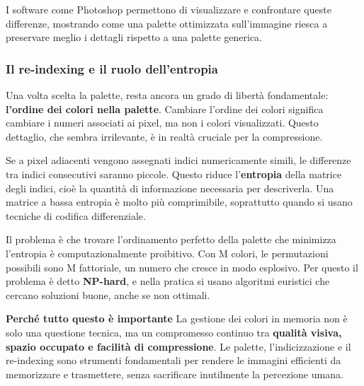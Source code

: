 \documentclass[
]{article}
\begin{document}
I software come Photoshop permettono di visualizzare e confrontare queste differenze, mostrando come una palette ottimizzata sull'immagine riesca a preservare meglio i dettagli rispetto a una palette generica.

\hypertarget{il-re-indexing-e-il-ruolo-dellentropia}{%
\subsubsection{\texorpdfstring{\textbf{Il re-indexing e il ruolo dell'entropia}}{Il re-indexing e il ruolo dell'entropia}}\label{il-re-indexing-e-il-ruolo-dellentropia}}

Una volta scelta la palette, resta ancora un grado di libertà fondamentale: \textbf{l'ordine dei colori nella palette}. Cambiare l'ordine dei colori significa cambiare i numeri associati ai pixel, ma non i colori visualizzati. Questo dettaglio, che sembra irrilevante, è in realtà cruciale per la compressione.

Se a pixel adiacenti vengono assegnati indici numericamente simili, le differenze tra indici consecutivi saranno piccole. Questo riduce l'\textbf{entropia} della matrice degli indici, cioè la quantità di informazione necessaria per descriverla. Una matrice a bassa entropia è molto più comprimibile, soprattutto quando si usano tecniche di codifica differenziale.

Il problema è che trovare l'ordinamento perfetto della palette che minimizza l'entropia è computazionalmente proibitivo. Con M colori, le permutazioni possibili sono M fattoriale, un numero che cresce in modo esplosivo. Per questo il problema è detto \textbf{NP-hard}, e nella pratica si usano algoritmi euristici che cercano soluzioni buone, anche se non ottimali.

\textbf{Perché tutto questo è importante}
La gestione dei colori in memoria non è solo una questione tecnica, ma un compromesso continuo tra \textbf{qualità visiva, spazio occupato e facilità di compressione}. Le palette, l'indicizzazione e il re-indexing sono strumenti fondamentali per rendere le immagini efficienti da memorizzare e trasmettere, senza sacrificare inutilmente la percezione umana.
\end{document}
